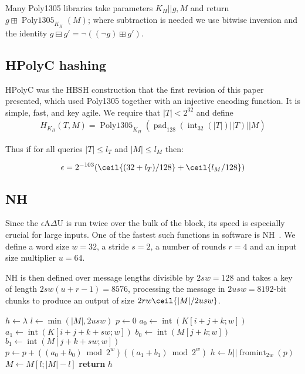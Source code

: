 \documentclass[journal=tosc,preprint,floatrow,submission]{iacrtrans}
\DeclareMathOperator{\Polydjb}{Poly1305}
\DeclareMathOperator{\intify}{int}
\DeclareMathOperator{\fromint}{fromint}
\DeclareMathOperator{\pad}{pad}
\begin{document}
Many Poly1305 libraries
take parameters $K_H || g, M$ and return $g \boxplus \Polydjb_{K_H}(M)$; where subtraction
is needed we use bitwise inversion and the identity
$g \boxminus g' = \neg ((\neg g) \boxplus g')$.

\subsection{HPolyC hashing}
HPolyC was the HBSH construction that the first revision of this paper presented, which used
Poly1305 together with an injective encoding function.
It is simple, fast, and key agile. We require that $|T| < 2^{32}$ and define
\begin{align*}
H_{K_H}(T, M) = \Polydjb_{K_H}(\pad_{128}(\intify_{32}(|T|) || T) || M)
\end{align*}

Thus if for all queries $|T| \leq l_T$ and $|M| \leq l_M$ then:

\begin{displaymath}
\epsilon = 2^{-103}(\ceil{(32 + l_T)/128} + \ceil{l_M/128})
\end{displaymath}

\subsection{NH}

Since the $\epsilon$A$\Delta$U is run twice over the bulk of the block, its speed is especially
crucial for large inputs. One of the fastest such functions in software is NH~\cite{nh}.
We define a word size $w = 32$, a stride $s = 2$,
a number of rounds $r = 4$ and an input size multiplier $u = 64$.

NH is then defined over message
lengths divisible by $2sw = 128$
and takes a key of length $2sw(u + r -1) = 8576$, processing the message
in $2usw = 8192$-bit chunks to produce
an output of size $2rw\ceil{|M|/2usw}$.

\begin{algorithmic}[0]
    \State $h \gets \lambda$
        \State $l \gets \min{(|M|, 2usw)}$
            \State $p \gets 0$
                    \State $a_0 \gets \intify(K[i+j+k;w])$
                    \State $a_1 \gets \intify(K[i+j+k+sw;w])$
                    \State $b_0 \gets \intify(M[j+k;w])$
                    \State $b_1 \gets \intify(M[j+k+sw;w])$
                    \State $p \gets p + ((a_0 + b_0) \bmod 2^w)((a_1 + b_1) \bmod 2^w)$
                \EndFor
            \EndFor
            \State $h \gets h || \fromint_{2w}(p)$
        \EndFor
        \State $M \gets M[l;|M| - l]$
    \EndWhile
    \State \textbf{return} $h$
    \EndProcedure
\end{algorithmic}
\end{document}
